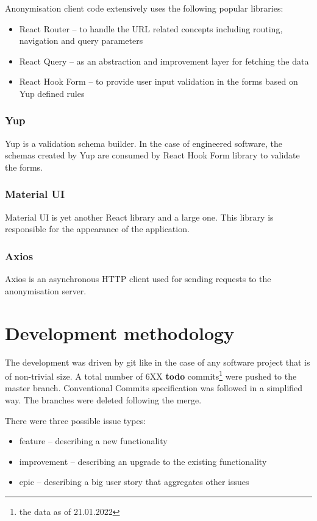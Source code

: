 \documentclass[a4paper,twoside,12pt]{book}
\begin{document}
Anonymisation client code extensively uses the following popular libraries:
\begin{itemize}
\item React Router – to handle the URL related concepts including routing, navigation and query parameters
\item React Query – as an abstraction and improvement layer for fetching the data
\item React Hook Form – to provide user input validation in the forms based on Yup defined rules
\end{itemize}

\subsubsection{Yup}

Yup is a validation schema builder. In the case of engineered software, the schemas created by Yup are consumed by React Hook Form library to validate the forms.

\subsubsection{Material UI}

Material UI is yet another React library and a large one. This library is responsible for the appearance of the application.

\subsubsection{Axios}

Axios is an asynchronous HTTP client used for sending requests to the anonymisation server.

\section{Development methodology}

The development was driven by git like in the case of any software project that is of non-trivial size. A total number of 6XX \textbf{todo} commits\footnote{the data as of 21.01.2022} were pushed to the master branch. Conventional Commits specification was followed in a simplified way. The branches were deleted following the merge.

There were three possible issue types:
\begin{itemize}
\item feature – describing a new functionality
\item improvement – describing an upgrade to the existing functionality
\item epic – describing a big user story that aggregates other issues \cite{bib:agile_essentials}
\end{itemize}
\end{document}
